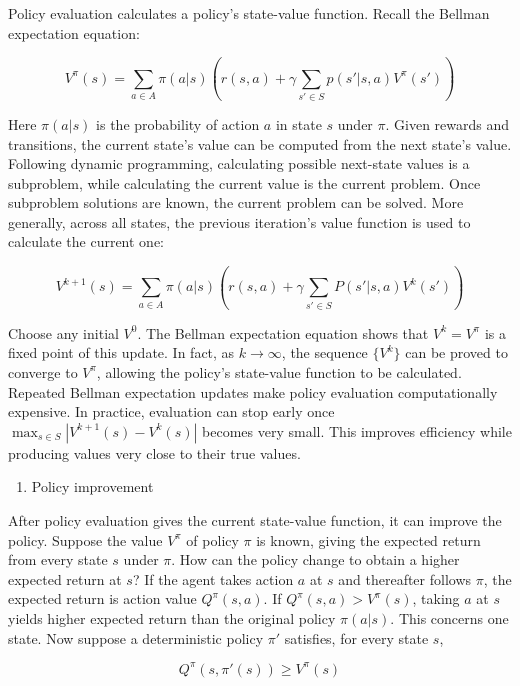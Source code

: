 Policy evaluation calculates a policy's state-value function. Recall the Bellman expectation equation:

\[
V^{\pi}(s)=\sum_{a\in A}\pi(a|s)(r(s,a)+\gamma\sum_{s'\in S}p(s'|s,a)V^{\pi}(s'))
\]

Here \(\pi(a|s)\) is the probability of action \(a\) in state \(s\) under \(\pi\). Given rewards and transitions, the current state's value can be computed from the next state's value. Following dynamic programming, calculating possible next-state values is a subproblem, while calculating the current value is the current problem. Once subproblem solutions are known, the current problem can be solved. More generally, across all states, the previous iteration's value function is used to calculate the current one:

\[
V^{k+1}(s)=\sum_{a\in A}\pi(a|s)(r(s,a)+\gamma\sum_{s'\in S}P(s'|s,a)V^{k}(s'))
\]

Choose any initial \(V^{0}\). The Bellman expectation equation shows that \(V^{k}=V^{\pi}\) is a fixed point of this update. In fact, as \(k\to\infty\), the sequence \(\{V^{k}\}\) can be proved to converge to \(V^{\pi}\), allowing the policy's state-value function to be calculated. Repeated Bellman expectation updates make policy evaluation computationally expensive. In practice, evaluation can stop early once \(\max_{s\in S}|V^{k+1}(s)-V^{k}(s)|\) becomes very small. This improves efficiency while producing values very close to their true values.

\begin{enumerate}
\def\labelenumi{(\arabic{enumi})}
\setcounter{enumi}{1}
\tightlist
\item
  Policy improvement
\end{enumerate}

After policy evaluation gives the current state-value function, it can improve the policy. Suppose the value \(V^{\pi}\) of policy \(\pi\) is known, giving the expected return from every state \(s\) under \(\pi\). How can the policy change to obtain a higher expected return at \(s\)? If the agent takes action \(a\) at \(s\) and thereafter follows \(\pi\), the expected return is action value \(Q^{\pi}(s,a)\). If \(Q^{\pi}(s,a)>V^{\pi}(s)\), taking \(a\) at \(s\) yields higher expected return than the original policy \(\pi(a|s)\). This concerns one state. Now suppose a deterministic policy \(\pi'\) satisfies, for every state \(s\),

\[
Q^{\pi}(s,\pi'(s))\ge V^{\pi}(s)
\]

